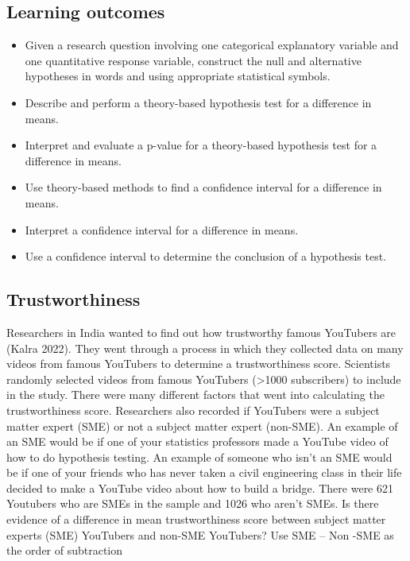 \documentclass[
]{report}
\begin{document}

\subsection{Learning outcomes}\label{learning-outcomes-6}

\begin{itemize}
\item
  Given a research question involving one categorical explanatory variable and one quantitative response variable, construct the null and alternative hypotheses
  in words and using appropriate statistical symbols.
\item
  Describe and perform a theory-based hypothesis test for a difference in means.
\item
  Interpret and evaluate a p-value for a theory-based hypothesis test for a difference in means.
\item
  Use theory-based methods to find a confidence interval for a difference in means.
\item
  Interpret a confidence interval for a difference in means.
\item
  Use a confidence interval to determine the conclusion of a hypothesis test.
\end{itemize}

\subsection{Trustworthiness}\label{trustworthiness}

Researchers in India wanted to find out how trustworthy famous YouTubers are (Kalra 2022). They went through a process in which they collected data on many videos from famous YouTubers to determine a trustworthiness score. Scientists randomly selected videos from famous YouTubers (\textgreater1000 subscribers) to include in the study. There were many different factors that went into calculating the trustworthiness score. Researchers also recorded if YouTubers were a subject matter expert (SME) or not a subject matter expert (non-SME). An example of an SME would be if one of your statistics professors made a YouTube video of how to do hypothesis testing. An example of someone who isn't an SME would be if one of your friends who has never taken a civil engineering class in their life decided to make a YouTube video about how to build a bridge. There were 621 Youtubers who are SMEs in the sample and 1026 who aren't SMEs. Is there evidence of a difference in mean trustworthiness score between subject matter experts (SME) YouTubers and non-SME YouTubers? Use SME -- Non -SME as the order of subtraction
\end{document}
